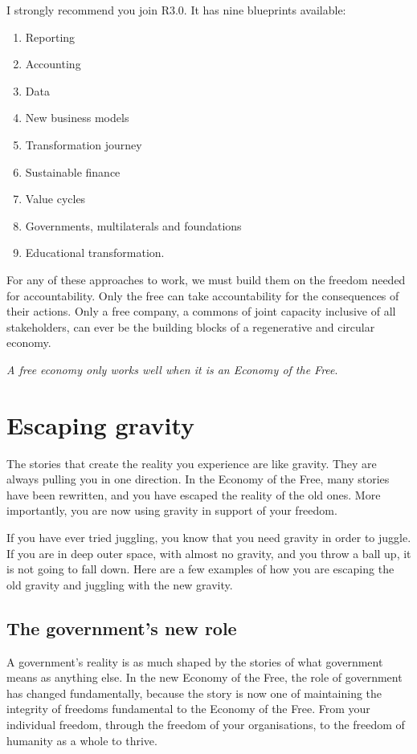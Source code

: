 I strongly recommend you join R3.0. It has nine blueprints available:


\begin{enumerate}
\item   Reporting
\item   Accounting
\item   Data
\item   New business models
\item   Transformation journey
\item   Sustainable finance
\item   Value cycles
\item   Governments, multilaterals and foundations
\item   Educational transformation.
\end{enumerate}


For any of these approaches to work, we must build them on the freedom  needed for accountability. Only the free can take accountability for the consequences of their actions. Only a free company, a commons of joint capacity inclusive of all stakeholders, can ever be the building blocks of a regenerative and circular economy.  


\emph{A free economy only works well when it is an Economy of the Free}. 
\section{Escaping gravity}
The stories that create the reality you experience are like gravity. They are always pulling you in one direction. In the Economy of the Free, many stories have been rewritten, and you have escaped the reality of the old ones. More importantly, you are now using gravity in support of your freedom.


If you have ever tried juggling, you know that you need gravity  in order to juggle. If you are in deep outer space, with almost no gravity, and you throw a ball up, it is not going to fall down. Here are a few examples of how you are escaping the old gravity and juggling with the new gravity.


\subsection{The government's new role}
A government’s reality is as much shaped by the stories of what government means as anything else. In the new Economy of the Free, the role of government has changed fundamentally, because the story is now one of maintaining the integrity of freedoms fundamental to the Economy of the Free. From your individual freedom, through the freedom of your organisations, to the freedom of humanity as a whole to thrive. 


